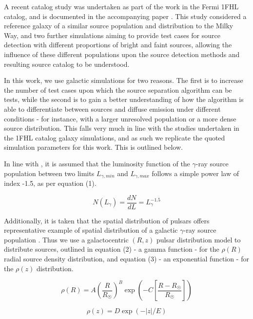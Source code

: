 \documentclass{PoS}
\begin{document}
A recent catalog study was undertaken as part of the work in the Fermi 1FHL catalog, and is documented in the accompanying paper \cite{1fhl}. This study considered a reference galaxy of a similar source population and distribution to the Milky Way, and two further simulations aiming to provide test cases for source detection with different proportions of bright and faint sources, allowing the influence of these different populations upon the source detection methods and resulting source catalog to be understood. 

In this work, we use galactic simulations for two reasons. The first is to increase the number of test cases upon which the source separation algorithm can be tests, while the second is to gain a better understanding of how the algorithm is able to differentiate between sources and diffuse emission under different conditions - for instance, with a larger unresolved population or a more dense source distribution. This falls very much in line with the studies undertaken in the 1FHL catalog galaxy simulations, and as such we replicate the quoted simulation parameters \cite[p.59]{1fhl} for this work. This is outlined below.

In line with \cite{Strong}, it is assumed that the luminosity function of the $\gamma$-ray source population between two limits $L_{\gamma, min}$ and $L_{\gamma, max}$ follows a simple power law of index -1.5, as per equation (1).

\begin{equation}
N(L_{\gamma}) = \frac{dN}{dL} = L_{\gamma}^{-1.5}
\end{equation}

Additionally, it is taken that the spatial distribution of pulsars offers representative example of spatial distribution of a galactic $\gamma$-ray source population \cite[p.2]{Strong}. Thus we use a galactocentric $(R, z)$ pulsar distribution model \cite[p.7]{Lorimer} to distribute sources, outlined in equation (2) - a gamma function - for the $\rho(R)$ radial source density distribution, and equation (3) - an exponential function - for the $\rho(z)$ distribution.

\begin{equation}
\rho(R) = A\left(\frac{R}{R_{\astrosun}}\right)^{B} \exp\left(-C\left[\frac{R-R_{\astrosun}}{R_{\astrosun}}\right]\right)
\end{equation}

\begin{equation}
\rho(z) = D \exp(-|z|/E)
\end{equation}
\end{document}
